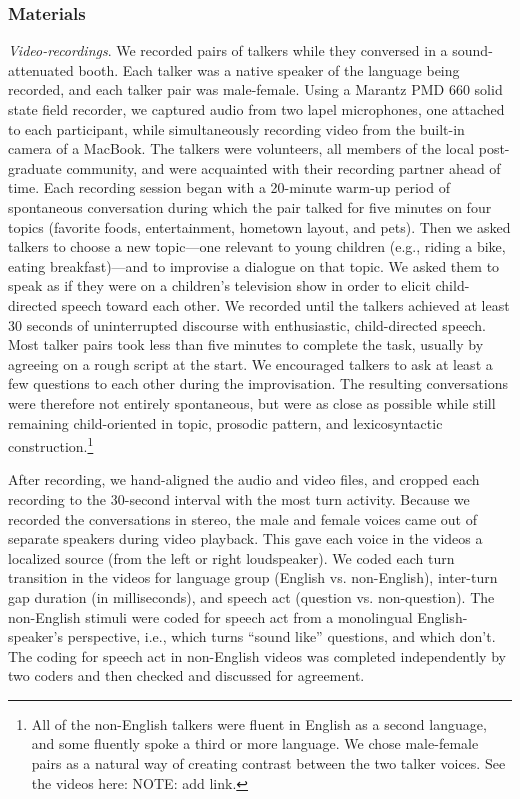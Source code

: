 \documentclass[authoryear, 12pt]{elsarticle}
\begin{document}
\subsubsection{Materials}

\textit{Video-recordings}. We recorded pairs of talkers while they conversed in a sound-attenuated booth. Each talker was a native speaker of the language being recorded, and each talker pair was male-female. Using a Marantz PMD 660 solid state field recorder, we captured audio from two lapel microphones, one attached to each participant, while simultaneously recording video from the built-in camera of a MacBook. The talkers were volunteers, all members of the local post-graduate community, and were acquainted with their recording partner ahead of time. Each recording session began with a 20-minute warm-up period of spontaneous conversation during which the pair talked for five minutes on four topics (favorite foods, entertainment, hometown layout, and pets). Then we asked talkers to choose a new topic---one relevant to young children (e.g., riding a bike, eating breakfast)---and to improvise a dialogue on that topic. We asked them to speak as if they were on a children's television show in order to elicit child-directed speech toward each other. We recorded until the talkers achieved at least 30 seconds of uninterrupted discourse with enthusiastic, child-directed speech. Most talker pairs took less than five minutes to complete the task, usually by agreeing on a rough script at the start. We encouraged talkers to ask at least a few questions to each other during the improvisation. The resulting conversations were therefore not entirely spontaneous, but were as close as possible while still remaining child-oriented in topic, prosodic pattern, and lexicosyntactic construction.\footnote{All of the non-English talkers were fluent in English as a second language, and some fluently spoke a third or more language. We chose male-female pairs as a natural way of creating contrast between the two talker voices. See the videos here: NOTE: add link.}

After recording, we hand-aligned the audio and video files, and cropped each recording to the 30-second interval with the most turn activity. Because we recorded the conversations in stereo, the male and female voices came out of separate speakers during video playback. This gave each voice in the videos a localized source (from the left or right loudspeaker). We coded each turn transition in the videos for language group (English vs. non-English), inter-turn gap duration (in milliseconds), and speech act (question vs. non-question). The non-English stimuli were coded for speech act from a monolingual English-speaker's perspective, i.e., which turns ``sound like'' questions, and which don't. The coding for speech act in non-English videos was completed independently by two coders and then checked and discussed for agreement.
\end{document}
